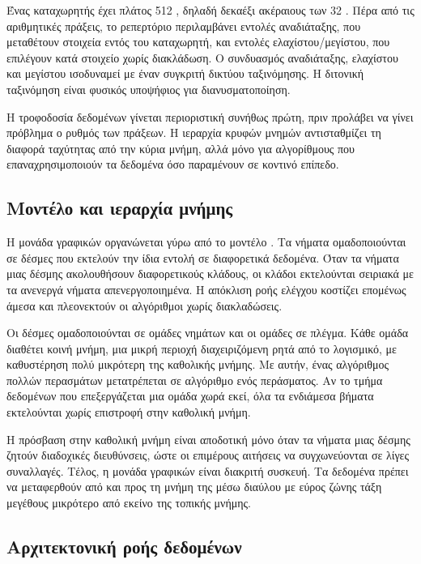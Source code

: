 Ένας καταχωρητής  έχει πλάτος 512 , δηλαδή δεκαέξι
ακέραιους των 32 . Πέρα από τις αριθμητικές πράξεις, το ρεπερτόριο
περιλαμβάνει εντολές αναδιάταξης, που μεταθέτουν στοιχεία εντός του καταχωρητή,
και εντολές ελαχίστου/μεγίστου, που επιλέγουν κατά στοιχείο χωρίς διακλάδωση. Ο
συνδυασμός αναδιάταξης, ελαχίστου και μεγίστου ισοδυναμεί με έναν συγκριτή
δικτύου ταξινόμησης. Η διτονική ταξινόμηση είναι φυσικός υποψήφιος για
διανυσματοποίηση.

Η τροφοδοσία δεδομένων γίνεται περιοριστική συνήθως πρώτη, πριν προλάβει να
γίνει πρόβλημα ο ρυθμός των πράξεων. Η ιεραρχία κρυφών μνημών αντισταθμίζει τη
διαφορά ταχύτητας από την κύρια μνήμη, αλλά μόνο για αλγορίθμους που
επαναχρησιμοποιούν τα δεδομένα όσο παραμένουν σε κοντινό επίπεδο.

\subsection{Μοντέλο  και ιεραρχία μνήμης }
\label{sec:bg-arch-gpu}

Η μονάδα γραφικών οργανώνεται γύρω από το μοντέλο . Τα νήματα
ομαδοποιούνται σε δέσμες που εκτελούν την ίδια εντολή σε διαφορετικά δεδομένα.
Όταν τα νήματα μιας δέσμης ακολουθήσουν διαφορετικούς κλάδους, οι κλάδοι
εκτελούνται σειριακά με τα ανενεργά νήματα απενεργοποιημένα. Η απόκλιση ροής
ελέγχου κοστίζει επομένως άμεσα και πλεονεκτούν οι αλγόριθμοι χωρίς
διακλαδώσεις.

Οι δέσμες ομαδοποιούνται σε ομάδες νημάτων και οι ομάδες σε πλέγμα. Κάθε ομάδα
διαθέτει κοινή μνήμη, μια μικρή περιοχή διαχειριζόμενη ρητά από το λογισμικό,
με καθυστέρηση πολύ μικρότερη της καθολικής μνήμης. Με αυτήν, ένας αλγόριθμος
πολλών περασμάτων μετατρέπεται σε αλγόριθμο ενός περάσματος. Αν το τμήμα
δεδομένων που επεξεργάζεται μια ομάδα χωρά εκεί, όλα τα ενδιάμεσα βήματα
εκτελούνται χωρίς επιστροφή στην καθολική μνήμη.

Η πρόσβαση στην καθολική μνήμη είναι αποδοτική μόνο όταν τα νήματα μιας δέσμης
ζητούν διαδοχικές διευθύνσεις, ώστε οι επιμέρους αιτήσεις να συγχωνεύονται σε
λίγες συναλλαγές. Τέλος, η μονάδα γραφικών είναι διακριτή συσκευή. Τα δεδομένα
πρέπει να μεταφερθούν από και προς τη μνήμη της μέσω διαύλου με εύρος ζώνης
τάξη μεγέθους μικρότερο από εκείνο της τοπικής μνήμης.

\subsection{Αρχιτεκτονική ροής δεδομένων }
\label{sec:bg-arch-npu}

